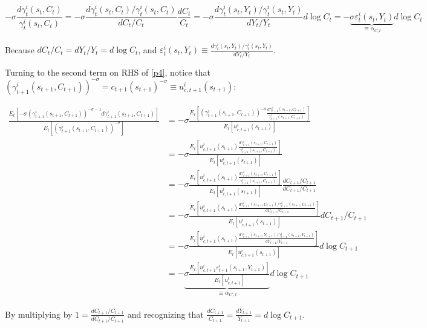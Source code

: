 \documentclass{article}
\begin{document}
\begin{enumerate}
$$
- \sigma \frac{d\gamma_t^i(s_t, C_t)}{\gamma_t^i(s_t, C_t)} = - \sigma \frac{d\gamma_t^i(s_t, C_t)/\gamma_t^i(s_t, C_t)}{dC_t/C_t} \frac{dC_t}{C_t}
=
-\sigma \frac{d\gamma_t^i(s_t, Y_t)/\gamma_t^i(s_t, Y_t)}{dY_t/Y_t} d\log C_t 
=
-\underbrace{\sigma \varepsilon_t^i(s_t, Y_t)}_{\equiv \alpha_{C, t}} d\log C_t
$$

Because $dC_t/C_t = dY_t /Y_t = d\log C_t$, and $\varepsilon_t^i(s_t, Y_t) \equiv \frac{d\gamma_t^i(s_t, Y_t)/\gamma_t^i(s_t, Y_t)}{dY_t/Y_t}$. 

Turning to the second term on RHS of \ref{p4}, notice that $(\gamma_{t+1}^i(s_{t+1}, C_{t+1}))^{-\sigma} = c_{t+1}(s_{t+1})^{-\sigma}  \equiv u_{c, t+1}^i(s_{t+1})$:

\begin{align*}
\frac{E_t[-\sigma(\gamma_{t+1}^i(s_{t+1}, C_{t+1}))^{-\sigma-1}d\gamma_{t+1}^i(s_{t+1}, C_{t+1})]}{ E_t[(\gamma_{t+1}^i(s_{t+1}, C_{t+1}))^{-\sigma}]}
&=
-\sigma \frac{E_t[(\gamma_{t+1}^i(s_{t+1}, C_{t+1}))^{-\sigma}\frac{d\gamma_{t+1}^i(s_{t+1}, C_{t+1})}{\gamma_{t+1}^i(s_{t+1}, C_{t+1})}]}{ E_t[u_{c, t+1}^i(s_{t+1})]}\\
&=
-\sigma \frac{E_t[u_{c, t+1}^i(s_{t+1})\frac{d\gamma_{t+1}^i(s_{t+1}, C_{t+1})}{\gamma_{t+1}^i(s_{t+1}, C_{t+1})}]}{ E_t[u_{c, t+1}^i(s_{t+1})]}\\
&=
-\sigma \frac{E_t[u_{c, t+1}^i(s_{t+1})\frac{d\gamma_{t+1}^i(s_{t+1}, C_{t+1})}{\gamma_{t+1}^i(s_{t+1}, C_{t+1})}]}{ E_t[u_{c, t+1}^i(s_{t+1})]}\frac{dC_{t+1}/C_{t+1}}{dC_{t+1}/C_{t+1}}\\
&=
-\sigma \frac{E_t[u_{c, t+1}^i(s_{t+1})\frac{d\gamma_{t+1}^i(s_{t+1}, C_{t+1})/\gamma_{t+1}^i(s_{t+1}, C_{t+1})}{dC_{t+1}/C_{t+1}}]}{ E_t[u_{c, t+1}^i(s_{t+1})]}dC_{t+1}/C_{t+1}\\
&=
-\sigma \frac{E_t[u_{c, t+1}^i(s_{t+1})\frac{d\gamma_{t+1}^i(s_{t+1}, Y_{t+1})/\gamma_{t+1}^i(s_{t+1}, Y_{t+1})}{dY_{t+1}/Y_{t+1}}]}{ E_t[u_{c, t+1}^i(s_{t+1})]}d\log C_{t+1}\\
&=
-\underbrace{\sigma \frac{E_t[u_{c, t+1}^i\varepsilon_{t+1}^i(s_{t+1}, Y_{t+1})]}{ E_t[u_{c, t+1}^i]}}_{\equiv \alpha_{C',t}}d\log C_{t+1}
\end{align*}

By multiplying by $1 = \frac{dC_{t+1}/C_{t+1}}{dC_{t+1}/C_{t+1}}$ and recognizing that $\frac{dC_{t+1}}{C_{t+1}} = \frac{dY_{t+1}}{Y_{t+1}} = d \log C_{t+1}$.


\end{enumerate}
\end{document}

